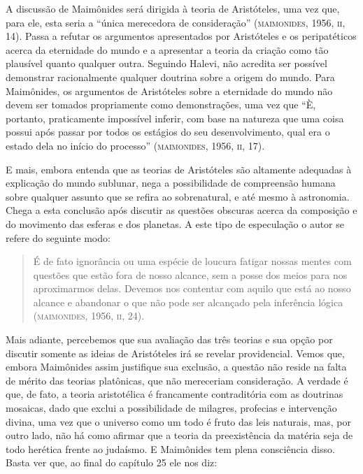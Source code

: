 A discussão de Maimônides será dirigida à teoria de Aristóteles, uma
vez que, para ele, esta seria a “única merecedora de consideração”
(\textsc{maimonides}, 1956, \textsc{ii}, 14). Passa a refutar os argumentos
apresentados por Aristóteles e os peripatéticos acerca da eternidade
do mundo e a apresentar a teoria da criação como tão plausível quanto
qualquer outra. Seguindo Halevi, não acredita ser possível demonstrar
racionalmente qualquer doutrina sobre a origem do mundo. Para
Maimônides, os argumentos de Aristóteles sobre a eternidade do mundo
não devem ser tomados propriamente como demonstrações, uma vez que
“È, portanto, praticamente impossível inferir, com base na natureza
que uma coisa possui após passar por todos os estágios do seu
desenvolvimento, qual era o estado dela no início do processo”
(\textsc{maimonides}, 1956, \textsc{ii}, 17).

E mais, embora entenda que as teorias de Aristóteles são altamente
adequadas à explicação do mundo sublunar, nega a possibilidade de
compreensão humana sobre qualquer assunto que se refira ao
sobrenatural, e até mesmo à astronomia. Chega a esta conclusão após
discutir as questões obscuras acerca da composição e do movimento das
esferas e dos planetas. A este tipo de especulação o autor se refere
do seguinte modo:

\begin{quote}
É de fato ignorância ou uma espécie de loucura fatigar nossas mentes
com questões que estão fora de nosso alcance, sem a posse dos meios
para nos aproximarmos delas. Devemos nos contentar com aquilo que
está ao nosso alcance e abandonar o que não pode ser alcançado pela
inferência lógica (\textsc{maimonides}, 1956, \textsc{ii}, 24).
\end{quote}

Mais adiante, percebemos que sua avaliação das três teorias e sua
opção por discutir somente as ideias de Aristóteles irá se revelar
providencial. Vemos que, embora Maimônides assim justifique sua
exclusão, a questão não reside na falta de mérito das teorias
platônicas, que não mereceriam consideração. A verdade é que, de
fato, a teoria aristotélica é francamente contraditória com as
doutrinas mosaicas, dado que exclui a possibilidade de milagres,
profecias e intervenção divina, uma vez que o universo como um todo é
fruto das leis naturais, mas, por outro lado, não há como afirmar que
a teoria da preexistência da matéria seja de todo herética frente ao
judaísmo. E Maimônides tem plena consciência disso. Basta ver que, ao
final do capítulo 25 ele nos diz:

